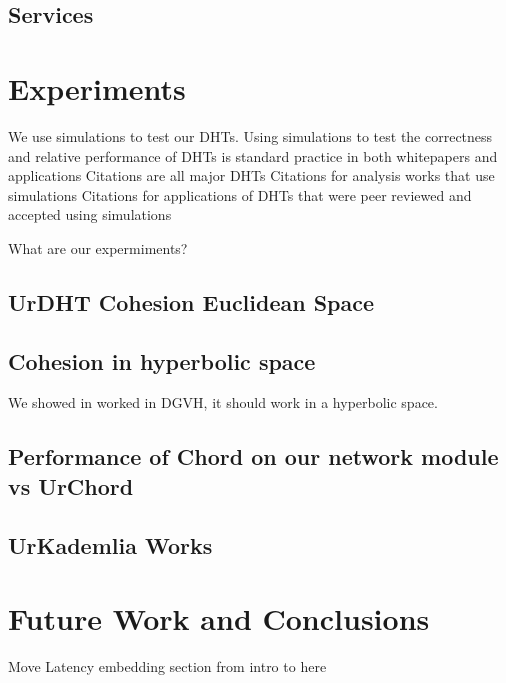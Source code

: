 \documentclass[11pt,conference]{IEEEtran}
\begin{document}
	\subsection{Services}
	
	
\section{Experiments}
\label{sec:experiments}

We use simulations to test our DHTs.
Using simulations to test the correctness and relative performance of DHTs is standard practice in both whitepapers and applications
Citations are all major DHTs
Citations for analysis works that use simulations
Citations for applications of DHTs that were peer reviewed and accepted using simulations

What are our expermiments?

\subsection{UrDHT Cohesion Euclidean Space}


\subsection{Cohesion in hyperbolic space}
We showed in worked in DGVH, it should work in a hyperbolic space.


\subsection{Performance of Chord on our network module vs UrChord}


\subsection{UrKademlia Works}


\section{Future Work and Conclusions}
\label{sec:future}

Move Latency embedding section from intro to here


\end{document}
